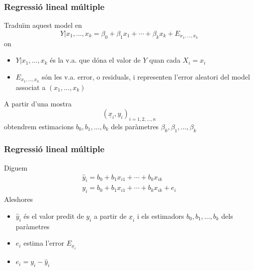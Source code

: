 \documentclass[12pt,t]{beamer}
\theoremstyle{plain}
\theoremstyle{definition}
\begin{document}
\begin{frame}
\frametitle{Regressió lineal múltiple}
\vspace*{-2ex}

Traduïm aquest model en
$$
Y|x_1,\ldots,x_k=\beta_0+\beta_1 x_{1}+\cdots+\beta_{k} x_k+E_{x_1,\ldots,x_k}
$$
on
\begin{itemize}
\item $Y|x_1,\ldots,x_k$ és la v.a. que dóna el valor de $Y$ quan cada $X_i=x_i$
\medskip

\item $E_{x_1,\ldots,x_k}$ són les v.a. error, o residuals, i representen l'error aleatori del model associat a
$(x_1,\ldots,x_k)$
\end{itemize}

A partir d'una mostra
$$
(\underline{x}_{i},y_i)_{i=1,2,\ldots,n}
$$
obtendrem estimacions $b_0,b_1,\ldots,b_k$ dels paràmetres $\beta_0,\beta_1,\ldots,\beta_k$
\end{frame}


\begin{frame}
\frametitle{Regressió lineal múltiple}
Diguem
$$
\begin{array}{l}
\widehat{y}_i=b_0+b_1 x_{i 1}+\cdots+b_{k} x_{i k}\\
y_i=b_0+b_1 x_{i 1}+\cdots+b_{k} x_{i k}+e_i
\end{array}
$$
Aleshores
\begin{itemize}
\item $\widehat{y}_i$ és el valor predit de $y_i$ a partir de $\underline{x}_{i}$ i els estimadors $b_0,b_1,\ldots,b_k$ dels paràmetres
\medskip

\item $e_i$ estima l'error $E_{\underline{x}_{i}}$
\medskip

\item $e_i=y_i-\widehat{y}_i$
\end{itemize}
\end{frame}
\end{document}
